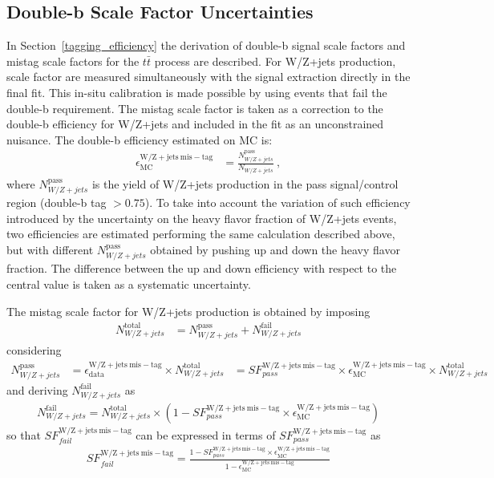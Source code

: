 \subsection{Double-b Scale Factor Uncertainties}\label{sec:doublebunc}
 
In Section~\ref{tagging_efficiency} the derivation of double-b signal scale factors and mistag scale factors for the $t\bar{t}$ process are described. For W/Z+jets production, scale factor are measured simultaneously with the signal extraction directly in the final fit. This in-situ calibration is made possible by using events that fail the double-b requirement. 
The mistag scale factor is taken as a correction to the double-b efficiency for W/Z+jets and included in the fit as an unconstrained nuisance. The double-b efficiency estimated on MC is:
\begin{align}
\epsilon^{\mathrm{W/Z+jets~mis-tag}}_{\mathrm{MC}} &=\frac{N^{\mathrm{pass}}_{W/Z+jets}}{N_{W/Z+jets}} ~,
\end{align}
where $N^{\mathrm{pass}}_{W/Z+jets}$ is the yield of W/Z+jets production in the pass signal/control region (double-b tag $> 0.75$). To take into account the variation of such efficiency introduced by the uncertainty on the heavy flavor fraction of W/Z+jets events, two efficiencies are estimated performing the same calculation described above, but with different $N^{\mathrm{pass}}_{W/Z+jets}$ obtained by pushing up and down the heavy flavor fraction. The difference between the up and down efficiency with respect to the central value is taken as a systematic uncertainty.

The mistag scale factor for W/Z+jets production is obtained by imposing 
\begin{align}
N^{\mathrm{total}}_{W/Z+jets} &=N^{\mathrm{pass}}_{W/Z+jets} + N^{\mathrm{fail}}_{W/Z+jets}
\end{align}
considering
\begin{align}
N^{\mathrm{pass}}_{W/Z+jets} &= \epsilon^{\mathrm{W/Z+jets~mis-tag}}_{\mathrm{data}}\times N^{\mathrm{total}}_{W/Z+jets} &= SF^{\mathrm{W/Z+jets~mis-tag}}_{pass}\times \epsilon^{\mathrm{W/Z+jets~mis-tag}}_{\mathrm{MC}}\times N^{\mathrm{total}}_{W/Z+jets}
\end{align}
and deriving $N^{\mathrm{fail}}_{W/Z+jets}$ as
\begin{align}
N^{\mathrm{fail}}_{W/Z+jets} = N^{\mathrm{total}}_{W/Z+jets}\times (1 - SF^{\mathrm{W/Z+jets~mis-tag}}_{pass}\times \epsilon^{\mathrm{W/Z+jets~mis-tag}}_{\mathrm{MC}})
\end{align}
so that $SF^{\mathrm{W/Z+jets~mis-tag}}_{fail}$ can be expressed in terms of $SF^{\mathrm{W/Z+jets~mis-tag}}_{pass}$ as
\begin{align}
SF^{\mathrm{W/Z+jets~mis-tag}}_{fail} = \frac{1 - SF^{\mathrm{W/Z+jets~mis-tag}}_{pass}\times \epsilon^{\mathrm{W/Z+jets~mis-tag}}_{\mathrm{MC}}}{1 - \epsilon^{\mathrm{W/Z+jets~mis-tag}}_{\mathrm{MC}}}
\end{align}

